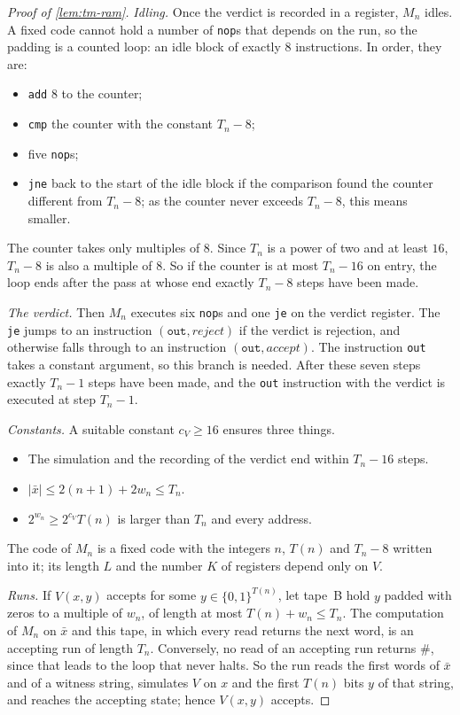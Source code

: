\documentclass[11pt,letterpaper]{article}
\theoremstyle{definition}
\theoremstyle{remark}
\newcommand{\abs}[1]{\left|#1\right|}
\begin{document}
\begin{proof}[Proof of \cref{lem:tm-ram}]
\emph{Idling.} Once the verdict is recorded in a register, \(M_n\)
idles. A fixed code cannot hold a number of \texttt{nop}s that depends
on the run, so the padding is a counted loop: an idle block of exactly
\(8\) instructions. In order, they are:
\begin{itemize}
\item \texttt{add} \(8\) to the counter;
\item \texttt{cmp} the counter with the constant \(T_n-8\);
\item five \texttt{nop}s;
\item \texttt{jne} back to the start of the idle block if the comparison
found the counter different from \(T_n-8\); as the counter never exceeds
\(T_n-8\), this means smaller.
\end{itemize}
The counter takes only multiples of \(8\). Since \(T_n\) is a power of
two and at least \(16\), \(T_n-8\) is also a multiple of \(8\). So if the
counter is at most \(T_n-16\) on entry, the loop ends after the pass at
whose end exactly \(T_n-8\) steps have been made.

\emph{The verdict.} Then \(M_n\) executes six \texttt{nop}s and one
\texttt{je} on the verdict register. The \texttt{je} jumps to an
instruction \((\texttt{out},\textit{reject})\) if the verdict is
rejection, and otherwise falls through to an instruction
\((\texttt{out},\textit{accept})\). The instruction \texttt{out} takes a
constant argument, so this branch is needed. After these seven steps
exactly \(T_n-1\) steps have been made, and the \texttt{out} instruction
with the verdict is executed at step \(T_n-1\).

\emph{Constants.} A suitable constant \(c_V\ge16\) ensures three things.
\begin{itemize}
\item The simulation and the recording of the verdict end within
\(T_n-16\) steps.
\item \(\abs{\bar x}\le2(n+1)+2w_n\le T_n\).
\item \(2^{w_n}\ge2^{c_V}T(n)\) is larger than \(T_n\) and every
address.
\end{itemize}
The code of \(M_n\) is a fixed code with the integers \(n\), \(T(n)\)
and \(T_n-8\) written into it; its length \(L\) and the number \(K\) of
registers depend only on \(V\).

\emph{Runs.} If \(V(x,y)\) accepts for some \(y\in\{0,1\}^{T(n)}\), let
tape~B hold \(y\) padded with zeros to a multiple of \(w_n\), of length
at most \(T(n)+w_n\le T_n\). The computation of \(M_n\) on \(\bar x\) and
this tape, in which every read returns the next word, is an accepting
run of length \(T_n\). Conversely, no read of an accepting run returns
\(\#\), since that leads to the loop that never halts. So the run reads
the first words of \(\bar x\) and of a witness string, simulates \(V\) on
\(x\) and the first \(T(n)\) bits \(y\) of that string, and reaches the
accepting state; hence \(V(x,y)\) accepts.
\end{proof}
\end{document}
